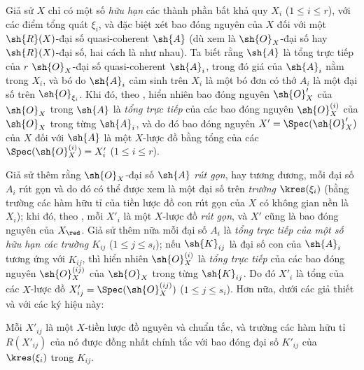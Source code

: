 \documentclass[oneside,10pt]{amsart}
\renewcommand{\leq}{\leqslant}
\newcommand{\oldpage}[2][]{\marginnote{\normalfont\footnotesize\textbf{#1}~|~#2}\ignorespaces}
\let\EGAOriginalLabel\label
\renewcommand{\label}[1]{\phantomsection\EGAOriginalLabel{#1}}
\begin{document}
\begin{env}[6.3.6]
\label{II.6.3.6}
Giả sử $X$ chỉ có một số \emph{hữu hạn} các thành phần bất khả quy $X_i$ ($1\leq i\leq r$), với các điểm tổng quát $\xi_i$, và đặc biệt xét bao đóng nguyên của $X$ đối với một $\sh{R}(X)$-đại số quasi-coherent $\sh{A}$ (dù xem là $\sh{O}_X$-đại số hay $\sh{R}(X)$-đại số, hai cách là như nhau).
Ta biết  rằng $\sh{A}$ là tổng trực tiếp của $r$ $\sh{O}_X$-đại số quasi-coherent $\sh{A}_i$, trong đó giá của $\sh{A}_i$ nằm trong $X_i$, và bó do $\sh{A}_i$ cảm sinh trên $X_i$ là một bó đơn có thớ $A_i$ là một đại số trên $\sh{O}_{\xi_i}$.
Khi đó, theo , hiển nhiên bao đóng nguyên $\sh{O}'_X$ của $\sh{O}_X$ trong $\sh{A}$ là \emph{tổng trực tiếp} của các bao đóng nguyên $\sh{O}_X^{(i)}$ của $\sh{O}_X$ trong từng $\sh{A}_i$, và do đó bao đóng nguyên $X'=\Spec(\sh{O}'_X)$ của $X$ đối với $\sh{A}$ là một $X$-lược đồ bằng tổng của các $\Spec(\sh{O}_X^{(i)})=X'_i$ ($1\leq i\leq r$).

Giả sử thêm rằng $\sh{O}_X$-đại số $\sh{A}$ \emph{rút gọn}, hay tương đương, mỗi đại số $A_i$ rút gọn và do đó có thể được xem là một đại số trên \emph{trường} $\kres(\xi_i)$ (bằng trường các hàm hữu tỉ của tiền lược đồ con rút gọn của $X$ có không gian nền là $X_i$);
khi đó, theo , mỗi $X'_i$ là một $X$-lược đồ \emph{rút gọn}, và $X'$ cũng là bao đóng nguyên của $X_\red$.
Giả sử thêm nữa mỗi đại số $A_i$ là \emph{tổng trực tiếp của một số hữu hạn các trường $K_{ij}$} ($1\leq j\leq s_i$);
nếu $\sh{K}_{ij}$ là đại số con của $\sh{A}_i$ tương ứng với $K_{ij}$, thì hiển nhiên $\sh{O}_X^{(i)}$ là \emph{tổng trực tiếp} của các bao đóng nguyên $\sh{O}_X^{(ij)}$ của $\sh{O}_X$ trong từng $\sh{K}_{ij}$.
Do đó $X'_i$ là tổng của các $X$-lược đồ $X'_{ij}=\Spec(\sh{O}_X^{(ij)})$ ($1\leq j\leq s_i$).
Hơn nữa, dưới các giả thiết và với các ký hiệu này:
\end{env}

\oldpage[II]{119}
\begin{proposition}[6.3.7]
\label{II.6.3.7}
Mỗi $X'_{ij}$ là một $X$-tiền lược đồ nguyên và chuẩn tắc, và trường các hàm hữu tỉ $R(X'_{ij})$ của nó được đồng nhất chính tắc với bao đóng đại số $K'_{ij}$ của $\kres(\xi_i)$ trong $K_{ij}$.
\end{proposition}
\end{document}
